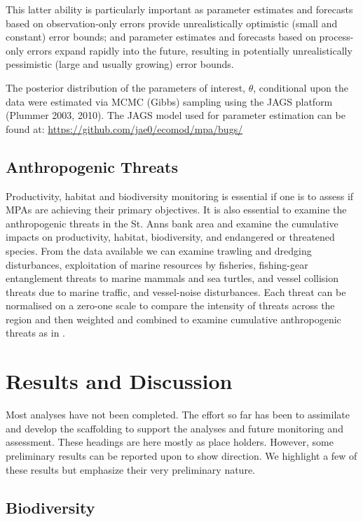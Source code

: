 \documentclass[letterpaper,portrait,11pt]{scrartcl}
\numberwithin{equation}{section}		%
\numberwithin{figure}{section}		%
\numberwithin{table}{section}				%
\begin{document}
This latter ability is particularly important as parameter estimates and forecasts based on observation-only errors provide unrealistically optimistic (small and constant) error bounds; and parameter estimates and forecasts based on process-only errors expand rapidly into the future, resulting in potentially unrealistically pessimistic (large and usually growing) error bounds.

The posterior distribution of the parameters of interest, $\theta$, conditional upon the data were estimated via MCMC (Gibbs) sampling using the JAGS platform (Plummer 2003, 2010). The JAGS model used for parameter estimation can be found at: \url{https://github.com/jae0/ecomod/mpa/bugs/}

\subsection{Anthropogenic Threats}
Productivity, habitat and biodiversity monitoring is essential if one is to assess if MPAs are achieving their primary objectives. It is also essential to examine the anthropogenic threats in the St. Anns bank area and examine the cumulative impacts on productivity, habitat, biodiversity, and endangered or threatened species. From the data available we can examine trawling and dredging disturbances, exploitation of marine resources by fisheries, fishing-gear entanglement threats to marine mammals and sea turtles, and vessel collision threats due to marine traffic, and vessel-noise disturbances. Each threat can be normalised on a zero-one scale to compare the intensity of threats across the region and then weighted and combined to examine cumulative anthropogenic threats as in \textcite{coll:2012:mediterranean}.

\section{Results and Discussion}

Most analyses have not been completed. The effort so far has been to assimilate and develop the scaffolding to support the analyses and future monitoring and assessment. These headings are here mostly as place holders. However, some preliminary results can be reported upon to show direction. We highlight a few of these results but emphasize their very preliminary nature. 

\subsection{Biodiversity}
\end{document}

